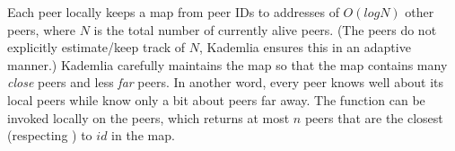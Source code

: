 Each peer locally keeps a map from peer IDs to addresses of $O(log{N})$ other peers, where $N$ is the total number of currently alive peers.
(The peers do not explicitly estimate/keep track of $N$, Kademlia ensures this in an adaptive manner.)
Kademlia carefully maintains the map so that the map contains many \emph{close} peers and less \emph{far} peers.
In another word, every peer knows well about its local peers while know only a bit about peers far away.
The function \lfind[$id$, $n$] can be invoked locally on the peers, which returns at most $n$ peers that are the closest (respecting \dist) to $id$ in the map.